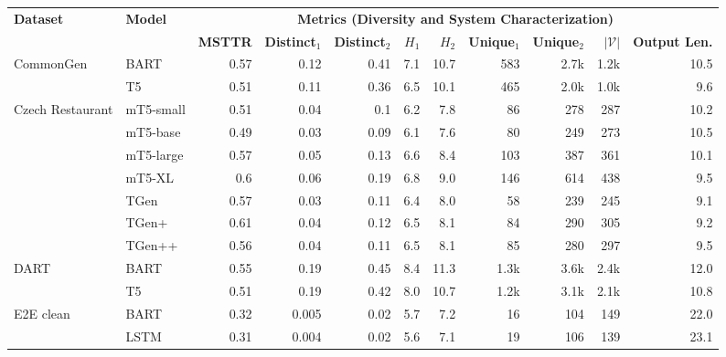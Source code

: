 \documentclass[11pt,a4paper]{article}
\begin{document}
\setlength{\tabcolsep}{4pt}\renewcommand{\arraystretch}{0.75}\begin{table*}[!htbp]
\centering
\small
\begin{tabular}{@{}llrrrrrrrrr@{}}
\toprule
\multirow{2}{*}{\textbf{Dataset}} & \multirow{2}{*}{\textbf{Model}} & \multicolumn{9}{c}{\textbf{Metrics {\fontsize{9}{10}\selectfont (Diversity and System Characterization)}}} \\ 
 &  & {\fontsize{7.5}{9}\selectfont \textbf{MSTTR}} & {\fontsize{7.5}{9}\selectfont \textbf{Distinct$_1$}} & {\fontsize{7.5}{9}\selectfont \textbf{Distinct$_2$}} & {\fontsize{7.5}{9}\selectfont \textbf{$H_1$}} & {\fontsize{7.5}{9}\selectfont \textbf{$H_2$}} & {\fontsize{7.5}{9}\selectfont \textbf{Unique$_1$}} & {\fontsize{7.5}{9}\selectfont \textbf{Unique$_2$}}& {\fontsize{7.5}{9}\selectfont \textbf{$|\mathcal{V}|$}} & {\fontsize{7.5}{9}\selectfont \textbf{Output Len.}} \\ \toprule
\multirow{2}{*}{CommonGen} & \small{BART} & 0.57 & 0.12 & 0.41 & 7.1 & 10.7 & 583 & 2.7k & 1.2k & 10.5 \\
 & \small{T5} & 0.51 & 0.11 & 0.36 & 6.5 & 10.1 & 465 & 2.0k & 1.0k & 9.6 \\
\midrule
\multirow{3}{*}{Czech Restaurant} & \small{mT5-small} & 0.51 & 0.04 & 0.1 & 6.2 & 7.8 & 86 & 278 & 287 & 10.2 \\
 & \small{mT5-base} & 0.49 & 0.03 & 0.09 & 6.1 & 7.6 & 80 & 249 & 273 & 10.5 \\
 & \small{mT5-large} & 0.57 & 0.05 & 0.13 & 6.6 & 8.4 & 103 & 387 & 361 & 10.1 \\
 & \small{mT5-XL} & 0.6 & 0.06 & 0.19 & 6.8 & 9.0 & 146 & 614 & 438 & 9.5 \\
 & \small{TGen} & 0.57 & 0.03 & 0.11 & 6.4 & 8.0 & 58 & 239 & 245 & 9.1 \\
 & \small{TGen+} & 0.61 & 0.04 & 0.12 & 6.5 & 8.1 & 84 & 290 & 305 & 9.2 \\
 & \small{TGen++} & 0.56 & 0.04 & 0.11 & 6.5 & 8.1 & 85 & 280 & 297 & 9.5 \\
\midrule
\multirow{2}{*}{DART} & \small{BART} & 0.55 & 0.19 & 0.45 & 8.4 & 11.3 & 1.3k & 3.6k & 2.4k & 12.0 \\
 & \small{T5} & 0.51 & 0.19 & 0.42 & 8.0 & 10.7 & 1.2k & 3.1k & 2.1k & 10.8 \\
\midrule
\multirow{4}{*}{E2E clean} & \small{BART} & 0.32 & 0.005 & 0.02 & 5.7 & 7.2 & 16 & 104 & 149 & 22.0 \\
 & \small{LSTM} & 0.31 & 0.004 & 0.02 & 5.6 & 7.1 & 19 & 106 & 139 & 23.1 \\

\end{tabular}
\end{table*}
\end{document}
